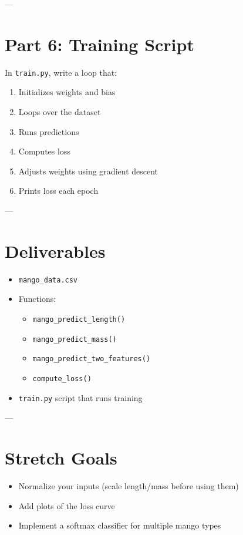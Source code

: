 \documentclass[12pt]{article}
\begin{document}
---

\section*{Part 6: Training Script}
In \texttt{train.py}, write a loop that:
\begin{enumerate}
    \item Initializes weights and bias
    \item Loops over the dataset
    \item Runs predictions
    \item Computes loss
    \item Adjusts weights using gradient descent
    \item Prints loss each epoch
\end{enumerate}

---

\section*{Deliverables}
\begin{itemize}
    \item \texttt{mango\_data.csv}
    \item Functions:
    \begin{itemize}
        \item \texttt{mango\_predict\_length()}
        \item \texttt{mango\_predict\_mass()}
        \item \texttt{mango\_predict\_two\_features()}
        \item \texttt{compute\_loss()}
    \end{itemize}
    \item \texttt{train.py} script that runs training
\end{itemize}

---

\section*{Stretch Goals}
\begin{itemize}
    \item Normalize your inputs (scale length/mass before using them)
    \item Add plots of the loss curve
    \item Implement a softmax classifier for multiple mango types
\end{itemize}
\end{document}
